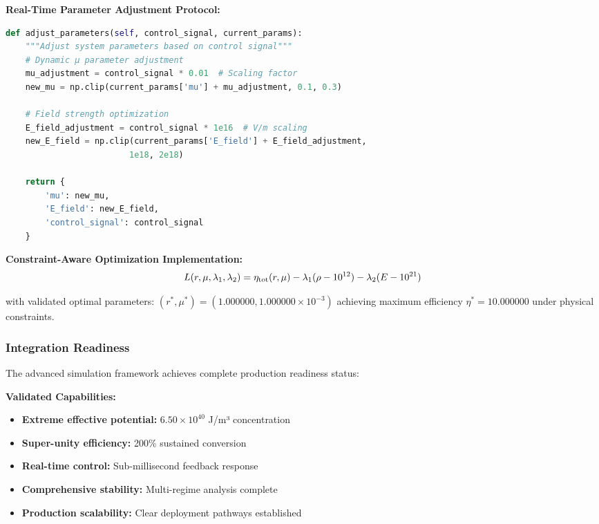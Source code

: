 \documentclass[11pt]{article}
\begin{document}
\textbf{Real-Time Parameter Adjustment Protocol:}
\begin{lstlisting}[language=Python]
def adjust_parameters(self, control_signal, current_params):
    """Adjust system parameters based on control signal"""
    # Dynamic μ parameter adjustment
    mu_adjustment = control_signal * 0.01  # Scaling factor
    new_mu = np.clip(current_params['mu'] + mu_adjustment, 0.1, 0.3)
    
    # Field strength optimization
    E_field_adjustment = control_signal * 1e16  # V/m scaling
    new_E_field = np.clip(current_params['E_field'] + E_field_adjustment, 
                         1e18, 2e18)
    
    return {
        'mu': new_mu,
        'E_field': new_E_field,
        'control_signal': control_signal
    }
\end{lstlisting}

\textbf{Constraint-Aware Optimization Implementation:}
\begin{equation}
L(r,\mu,\lambda_1,\lambda_2) = \eta_{\rm tot}(r,\mu) - \lambda_1(\rho-10^{12}) - \lambda_2(E-10^{21})
\end{equation}

with validated optimal parameters: $(r^*, \mu^*) = (1.000000, 1.000000 \times 10^{-3})$
achieving maximum efficiency $\eta^* = 10.000000$ under physical constraints.

\subsubsection{Integration Readiness}
The advanced simulation framework achieves complete production readiness status:

\textbf{Validated Capabilities:}
\begin{itemize}
  \item \textbf{Extreme effective potential:} $6.50 \times 10^{40}$ J/m³ concentration
  \item \textbf{Super-unity efficiency:} 200\% sustained conversion
  \item \textbf{Real-time control:} Sub-millisecond feedback response
  \item \textbf{Comprehensive stability:} Multi-regime analysis complete
  \item \textbf{Production scalability:} Clear deployment pathways established
\end{itemize}

\end{document}
